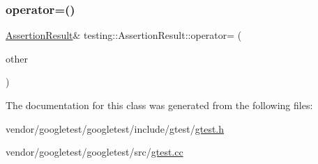 \mbox{\label{classtesting_1_1_assertion_result_aad9274c7b69eda67eb9306963a790839}} 
\subsubsection{\texorpdfstring{operator=()}{operator=()}}
{\footnotesize\ttfamily \hyperlink{classtesting_1_1_assertion_result}{Assertion\+Result}\& testing\+::\+Assertion\+Result\+::operator= (\begin{DoxyParamCaption}\item[{\hyperlink{classtesting_1_1_assertion_result}{Assertion\+Result}}]{other }\end{DoxyParamCaption})\hspace{0.3cm}{\ttfamily [inline]}}



The documentation for this class was generated from the following files\+:\begin{DoxyCompactItemize}
\item 
vendor/googletest/googletest/include/gtest/\hyperlink{gtest_8h}{gtest.\+h}\item 
vendor/googletest/googletest/src/\hyperlink{gtest_8cc}{gtest.\+cc}\end{DoxyCompactItemize}
